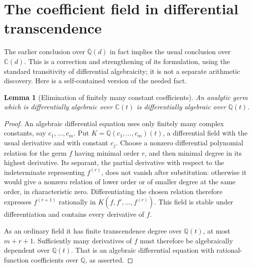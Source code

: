 \documentclass[11pt,a4paper]{article}
\newtheorem{lemma}[theorem]{Lemma}
\theoremstyle{definition}
\theoremstyle{remark}
\numberwithin{equation}{section}
\begin{document}
\section{The coefficient field in differential transcendence}
\label{p2:sec:constants-elimination-round2}

The earlier conclusion over $\overline{\mathbb Q}(d)$ in fact implies
the usual conclusion over $\mathbb C(d)$. This is a correction and
strengthening of its formulation, using the standard transitivity of
differential algebraicity; it is not a separate arithmetic discovery.
Here is a self-contained version of the needed fact.

\begin{lemma}[Elimination of finitely many constant coefficients]
\label{p2:lem:constant-elimination-round2}
An analytic germ which is differentially algebraic over
$\mathbb C(t)$ is differentially algebraic over $\mathbb Q(t)$.
\end{lemma}
\begin{proof}
An algebraic differential equation uses only finitely many complex
constants, say $c_1,\ldots,c_m$. Put
$K=\mathbb Q(c_1,\ldots,c_m)(t)$, a differential field with the usual
derivative and with constant $c_j$. Choose a nonzero differential
polynomial relation for the germ $f$ having minimal order $r$, and
then minimal degree in its highest derivative. Its separant, the
partial derivative with respect to the indeterminate representing
$f^{(r)}$, does not vanish after substitution: otherwise it would
give a nonzero relation of lower order or of smaller degree at the
same order, in characteristic zero. Differentiating the chosen
relation therefore expresses $f^{(r+1)}$ rationally in
$K(f,f',\ldots,f^{(r)})$. This field is stable under differentiation
and contains every derivative of $f$.

As an ordinary field it has finite transcendence degree over
$\mathbb Q(t)$, at most $m+r+1$. Sufficiently many derivatives of
$f$ must therefore be algebraically dependent over $\mathbb Q(t)$.
That is an algebraic differential equation with rational-function
coefficients over $\mathbb Q$, as asserted.
\end{proof}
\end{document}
